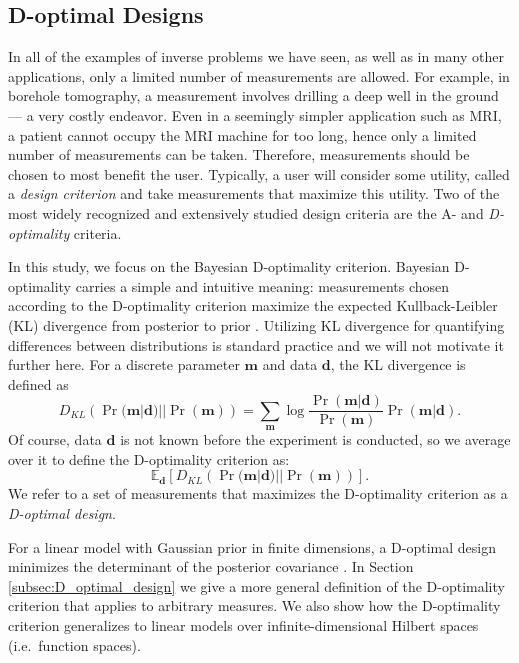 \documentclass[ba]{imsart}
\newcommand{\data}{\mathbf{d}}
\newcommand{\param}{\mathbf{m}}
\theoremstyle{plain}
\theoremstyle{definition}
\theoremstyle{remark}
\begin{document}
\subsection{D-optimal Designs}\label{subsec:D}
In all of the examples of inverse problems we have seen, as well as in
many other applications, only a limited number of measurements are
allowed. For example, in borehole tomography, a measurement involves
drilling a deep well in the ground --- a very costly endeavor. Even in
a seemingly simpler application such as MRI, a patient cannot occupy
the MRI machine for too long, hence only a limited number of
measurements can be taken. Therefore, measurements should be chosen to
most benefit the user. Typically, a user will consider some utility,
called a \emph{design criterion} and take measurements that maximize
this utility. Two of the most widely recognized and extensively
studied design criteria are the A- and \emph{D-optimality} criteria.

In this study, we focus on the Bayesian D-optimality
criterion. Bayesian D-optimality carries a simple and intuitive
meaning: measurements chosen according to the D-optimality criterion
maximize the expected Kullback-Leibler (KL) divergence from posterior
to prior \cite{chaloner1995, AlexanderianGloorGhattas14,
  CoverThomas91}. Utilizing KL divergence for quantifying differences
between distributions is standard practice and we will not motivate it
further here. For a discrete parameter $\param$ and data $\data$, the
KL divergence is defined as
\begin{equation}\label{eq:basic_KL}
  D_{KL}\left (\Pr(\param|\data)||\Pr(\param)\right ) =  \sum_{\param} \log
  \frac{\Pr(\param|\data)}{\Pr(\param)} \Pr(\param|\data). 
\end{equation}
Of course, data $\data$ is not known before the experiment is
conducted, so we average over it to define the D-optimality criterion
as:
\begin{equation*}
  \mathbb{E}_{\data}\left [ D_{KL}\left (\Pr(\param|\data)||\Pr(\param)\right ) \right ].
\end{equation*}
We refer to a set of measurements that maximizes the D-optimality
criterion as a \emph{D-optimal design}.

For a linear model with Gaussian prior in finite dimensions, a
D-optimal design minimizes the determinant of the posterior covariance
\cite{chaloner1995}. In Section \ref{subsec:D_optimal_design} we give
a more general definition of the D-optimality criterion that applies
to arbitrary measures. We also show how the D-optimality criterion
generalizes to linear models over infinite-dimensional Hilbert spaces
(i.e.~function spaces).
\end{document}
